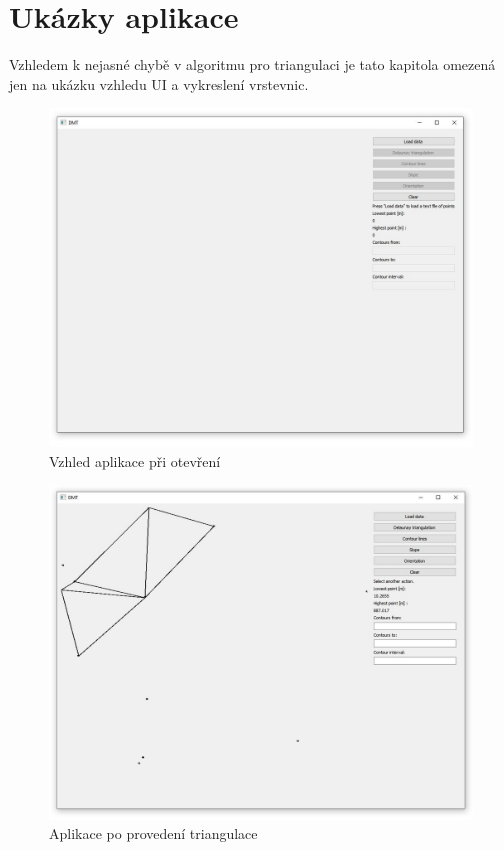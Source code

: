 \documentclass{article}
\begin{document}
\section{Ukázky aplikace} %
\indent Vzhledem k nejasné chybě v algoritmu pro triangulaci je tato kapitola omezená jen na ukázku vzhledu UI a vykreslení vrstevnic. \\
\begin{figure}[hp]
\centering
        \includegraphics[trim=0cm 0cm 0cm 0cm, width=1\textwidth]{startup.jpg}
        \caption{Vzhled aplikace při otevření}
\end{figure}

\begin{figure}[hp]
\centering
        \includegraphics[trim=0cm 0cm 0cm 0cm, width=1\textwidth]{triangulate.jpg}
        \caption{Aplikace po provedení triangulace}
\end{figure}
\end{document}
